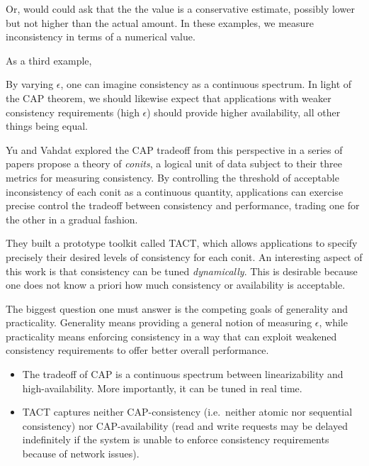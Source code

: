 \documentclass[]             %
{NASA}                       %
\theoremstyle{definition}
\begin{document}
Or, would could ask that the the value is a conservative estimate,
possibly lower but not higher than the actual amount. In these examples,
we measure inconsistency in terms of a numerical value.

As a third example,

By varying \(\epsilon\), one can imagine consistency as a continuous
spectrum. In light of the CAP theorem, we should likewise expect that
applications with weaker consistency requirements (high \(\epsilon\))
should provide higher availability, all other things being equal.

Yu and Vahdat explored the CAP tradeoff from this perspective in a
series of papers \cite{2000tact,2000tactalgorithms,10.5555/1251229.1251250,DBLP:conf/icdcs/YuV01,2002tact}
propose a theory of \emph{conits}, a logical unit of data subject to
their three metrics for measuring consistency. By controlling the
threshold of acceptable inconsistency of each conit as a continuous
quantity, applications can exercise precise control the tradeoff between
consistency and performance, trading one for the other in a gradual
fashion.

They built a prototype toolkit called TACT, which allows applications to
specify precisely their desired levels of consistency for each conit. An
interesting aspect of this work is that consistency can be tuned
\emph{dynamically}. This is desirable because one does not know a priori
how much consistency or availability is acceptable.

The biggest question one must answer is the competing goals of
generality and practicality. Generality means providing a general notion
of measuring \(\epsilon\), while practicality means enforcing
consistency in a way that can exploit weakened consistency requirements
to offer better overall performance.

\begin{itemize}
\item
  The tradeoff of CAP is a continuous spectrum between linearizability
  and high-availability. More importantly, it can be tuned in real time.
\item
  TACT captures neither CAP-consistency (i.e.~neither atomic nor
  sequential consistency) nor CAP-availability (read and write requests
  may be delayed indefinitely if the system is unable to enforce
  consistency requirements because of network issues).
\end{itemize}
\end{document}

